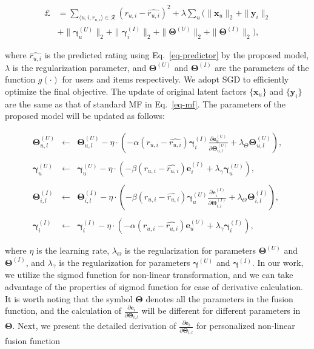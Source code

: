 \begin{align}
 \pounds &= \sum_{\langle u, i, r_{u,i}\rangle \in \mathcal{R}}{(r_{u,i} - \widehat{r_{u,i}})}^2  + \lambda \sum_u{(\|\mathbf{x}_u\|_2 + \|\mathbf{y}_i\|_2} \nonumber \\
 &+ \|\bm{\gamma}^{(U)}_u\|_2 + \|\bm{\gamma}^{(I)}_i\|_2 + \|\bm{\Theta}^{(U)}\|_2 + \|\bm{\Theta}^{(I)}\|_2),
\end{align}

\noindent where $\widehat{r_{u,i}}$ is the predicted rating using Eq.~\ref{eq-predictor} by the proposed model, $\lambda$ is the regularization parameter,
and $\bm{\Theta}^{(U)}$ and $\bm{\Theta}^{(I)}$ are the parameters of the function $g(\cdot)$ for users and items respectively. We adopt SGD to efficiently optimize the final objective.
The update of original latent factors $\{\mathbf{x}_u\}$ and $\{\mathbf{y}_i\}$ are the same as that of standard MF in Eq.~\ref{eq-mf}.
The parameters of the proposed model will be updated as follows:

\begin{footnotesize}
\begin{eqnarray}
\bm{\Theta}_{u,l}^{(U)} &\leftarrow& \bm{\Theta}_{u,l}^{(U)} - \eta \cdot (-\alpha (r_{u,i}-\widehat{r_{u,i}})\bm{\gamma}_i^{(I)}\frac{\partial{\bm{e}_{u}^{(U)}}}{\partial{\bm{\Theta}_{u,l}^{(U)}}} + {\lambda_{\Theta}}\bm{\Theta}_{u,l}^{(U)}), \nonumber \\
\\
\bm{\gamma}_u^{(U)} &\leftarrow& \bm{\gamma}_u^{(U)} - \eta \cdot (-\beta (r_{u,i}-\widehat{r_{u,i}})\bm{e}_i^{(I)} + \lambda_{\gamma}\bm{\gamma}_u^{(U)}),\\
\nonumber\\
\bm{\Theta}_{i,l}^{(I)} &\leftarrow& \bm{\Theta}_{i,l}^{(I)} - \eta \cdot (-\beta (r_{u,i}-\widehat{r_{u,i}})\bm{\gamma}_u^{(U)}\frac{\partial{\bm{e}_{i}^{(I)}}}{\partial{\bm{\Theta}_{i,l}^{(I)}}} + {\lambda_{\Theta}}\bm{\Theta}_{i,l}^{(I)}), \nonumber \\
\\
\bm{\gamma}_i^{(I)} &\leftarrow& \bm{\gamma}_i^{(I)} - \eta \cdot (-\alpha (r_{u,i}-\widehat{r_{u,i}})\bm{e}_u^{(U)} + \lambda_{\gamma}\bm{\gamma}_i^{(I)}),
\end{eqnarray}
\end{footnotesize}
where $\eta$ is the learning rate, $\lambda_{\Theta}$ is the regularization for parameters $\bm{\Theta}^{(U)}$ and $\bm{\Theta}^{(I)}$,  and $\lambda_{\gamma}$ is the regularization for parameters $\bm{\gamma}^{(U)}$ and $\bm{\gamma}^{(I)}$.  In our work, we utilize the sigmod function for non-linear transformation, and we can take advantage of the properties of sigmod function for ease of derivative calculation. It is worth noting that the symbol $\bm{\Theta}$ denotes all the parameters in the fusion function, and the calculation of $\frac{\partial{\bm{e}_{i}}}{\partial{\bm{\Theta}_{i,l}}}$ will be different for different parameters in $\bm{\Theta}$. Next, we present the detailed derivation of $\frac{\partial{\bm{e}_{i}}}{\partial{\bm{\Theta}_{i,l}}}$ for personalized non-linear fusion function



